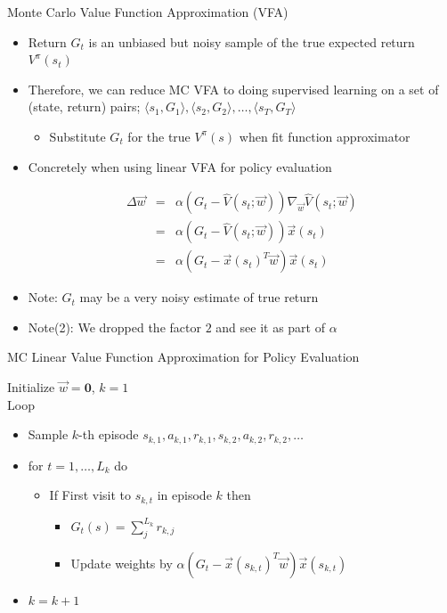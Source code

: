 \documentclass[aspectratio=169]{../latex_main/tntbeamer}  %
\begin{document}
\begin{frame}[c]{Monte Carlo Value Function Approximation (VFA)}
	
	
	\begin{itemize}
		\item Return $G_t$ is an unbiased but noisy sample of the true expected return $V^\pi(s_t)$
		\item Therefore, we can reduce MC VFA to doing supervised learning on a set of (state, return) pairs; $\langle s_1, G_1 \rangle, \langle s_2, G_2 \rangle,\ldots, \langle s_T, G_T \rangle$
		\begin{itemize}
			\item Substitute $G_t$ for the true $V^\pi(s)$ when fit function approximator
		\end{itemize}
		\item Concretely when using linear VFA for policy evaluation
		
		\begin{eqnarray}
		 \Delta \vec{w} &=& \alpha (G_t - \hat{V} (s_t; \vec{w})) \nabla_\vec{w}\hat{V}(s_t; \vec{w}) \nonumber\\
		 &=& \alpha (G_t - \hat{V} (s_t; \vec{w})) \vec{x}(s_t) \nonumber\\
		 &=& \alpha (G_t - \vec{x}(s_t)^T \vec{w}) \vec{x}(s_t) \nonumber
		\end{eqnarray}
		
		\item Note: $G_t$ may be a very noisy estimate of true return
		\item Note(2): We dropped the factor $2$ and see it as part of $\alpha$
		
	\end{itemize}
	
\end{frame}
\begin{frame}[c]{MC Linear Value Function Approximation for Policy
		Evaluation}
	

Initialize $\vec{w}= \mathbf{0}$, $k=1$\\
Loop	
	\begin{itemize}
		\item Sample $k$-th episode $s_{k,1}, a_{k,1}, r_{k,1}, s_{k,2}, a_{k,2}, r_{k,2}, \ldots$
		\item for $t=1, \ldots, L_k$ do
		\begin{itemize}
			\item If First visit to $s_{k,t}$ in episode $k$ then
			\begin{itemize}
					\item $G_t(s) = \sum_{j}^{L_k} r_{k,j}$
					\item Update weights by $\alpha (G_t - \vec{x}(s_{k,t})^T \vec{w}) \vec{x}(s_{k,t})$
			\end{itemize}
		\end{itemize}
	\item $k = k + 1$
	\end{itemize}
	
\end{frame}
\end{document}
